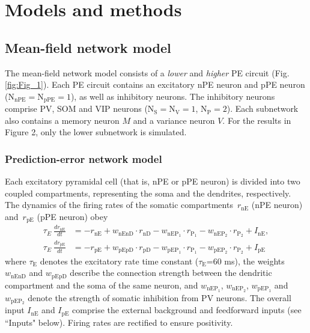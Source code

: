 \documentclass[10pt,a4paper,draft]{article}
\begin{document}
\section*{Models and methods}
%

\subsection*{Mean-field network model}
%
The mean-field network model consists of a \textit{lower} and \textit{higher} PE circuit (Fig. \ref{fig:Fig_1}). Each PE circuit contains an excitatory nPE neuron and pPE neuron ($\mathrm{N}_\mathrm{nPE} = \mathrm{N}_\mathrm{pPE} = 1$), as well as inhibitory neurons. The inhibitory neurons comprise PV, SOM and VIP neurons ($\mathrm{N}_\mathrm{S} = \mathrm{N}_\mathrm{V} = 1$, $\mathrm{N}_\mathrm{P} = 2$). Each subnetwork also contains a memory neuron $M$ and a variance neuron $V$. For the results in Figure 2, only the lower subnetwork is simulated.

\subsubsection*{Prediction-error network model}
%
Each excitatory pyramidal cell (that is, nPE or pPE neuron) is divided into two coupled compartments, representing the soma and the dendrites, respectively. The dynamics of the firing rates of the somatic compartments~$r_{\mathrm{nE}}$ (nPE neuron) and~$r_{\mathrm{pE}}$ (pPE neuron) obey \citep{wilson1972excitatory}
%
\begin{align}
\tau_E\ \frac{dr_\mathrm{nE}}{dt} &= - r_\mathrm{nE} + w_\mathrm{nEnD}\cdot  r_\mathrm{nD}  -  w_\mathrm{nEP_1}\cdot r_\mathrm{P_1}  -  w_\mathrm{nEP_2}\cdot r_\mathrm{P_2} + I_\mathrm{nE}, \nonumber\\
\tau_E\ \frac{dr_\mathrm{pE}}{dt} &= - r_\mathrm{pE} + w_\mathrm{pEpD}\cdot  r_\mathrm{pD}  -  w_\mathrm{pEP_1}\cdot r_\mathrm{P_1}  -  w_\mathrm{pEP_2}\cdot r_\mathrm{P_2} + I_\mathrm{pE}
\end{align}
%
where $\tau_\mathrm{E}$ denotes the excitatory rate time constant ($\tau_\mathrm{E}$=60 ms), the weights $w_{\mathrm{nEnD}}$ and $w_{\mathrm{pEpD}}$ describe the connection strength between the dendritic compartment and the soma of the same neuron, and $w_{\mathrm{nEP_1}}$, $w_{\mathrm{nEP_2}}$, $w_{\mathrm{pEP_1}}$ and $w_{\mathrm{pEP_2}}$ denote the strength of somatic inhibition from PV neurons. The overall input $I_\mathrm{nE}$ and $I_\mathrm{pE}$ comprise the external background and feedforward inputs (see ``Inputs" below). Firing rates are rectified to ensure positivity. 
\end{document}

